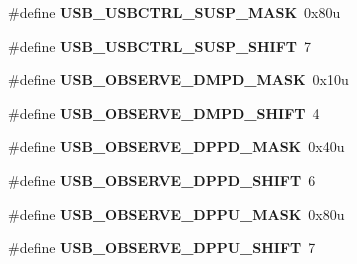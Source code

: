 \begin{DoxyCompactItemize}
\item 
\hypertarget{group___u_s_b___register___masks_gac65859ca12bfe997afc67545c8b1a052}{}\#define {\bfseries U\+S\+B\+\_\+\+U\+S\+B\+C\+T\+R\+L\+\_\+\+S\+U\+S\+P\+\_\+\+M\+A\+S\+K}~0x80u\label{group___u_s_b___register___masks_gac65859ca12bfe997afc67545c8b1a052}

\item 
\hypertarget{group___u_s_b___register___masks_ga44772d68648a57e6341ceec7fd5268f3}{}\#define {\bfseries U\+S\+B\+\_\+\+U\+S\+B\+C\+T\+R\+L\+\_\+\+S\+U\+S\+P\+\_\+\+S\+H\+I\+F\+T}~7\label{group___u_s_b___register___masks_ga44772d68648a57e6341ceec7fd5268f3}

\item 
\hypertarget{group___u_s_b___register___masks_ga796850497f75cc88772d3826d1196a43}{}\#define {\bfseries U\+S\+B\+\_\+\+O\+B\+S\+E\+R\+V\+E\+\_\+\+D\+M\+P\+D\+\_\+\+M\+A\+S\+K}~0x10u\label{group___u_s_b___register___masks_ga796850497f75cc88772d3826d1196a43}

\item 
\hypertarget{group___u_s_b___register___masks_ga044fcfc292ba6db33ec4e847a6510440}{}\#define {\bfseries U\+S\+B\+\_\+\+O\+B\+S\+E\+R\+V\+E\+\_\+\+D\+M\+P\+D\+\_\+\+S\+H\+I\+F\+T}~4\label{group___u_s_b___register___masks_ga044fcfc292ba6db33ec4e847a6510440}

\item 
\hypertarget{group___u_s_b___register___masks_ga8368ad607c0f5a0ab499734e26f36aad}{}\#define {\bfseries U\+S\+B\+\_\+\+O\+B\+S\+E\+R\+V\+E\+\_\+\+D\+P\+P\+D\+\_\+\+M\+A\+S\+K}~0x40u\label{group___u_s_b___register___masks_ga8368ad607c0f5a0ab499734e26f36aad}

\item 
\hypertarget{group___u_s_b___register___masks_gaba84f8caae5d942588bd678bbc2ad267}{}\#define {\bfseries U\+S\+B\+\_\+\+O\+B\+S\+E\+R\+V\+E\+\_\+\+D\+P\+P\+D\+\_\+\+S\+H\+I\+F\+T}~6\label{group___u_s_b___register___masks_gaba84f8caae5d942588bd678bbc2ad267}

\item 
\hypertarget{group___u_s_b___register___masks_ga04f8b1d77478cb027a79323cef482965}{}\#define {\bfseries U\+S\+B\+\_\+\+O\+B\+S\+E\+R\+V\+E\+\_\+\+D\+P\+P\+U\+\_\+\+M\+A\+S\+K}~0x80u\label{group___u_s_b___register___masks_ga04f8b1d77478cb027a79323cef482965}

\item 
\hypertarget{group___u_s_b___register___masks_ga08ff5b00473fda9eb458f3457490eb15}{}\#define {\bfseries U\+S\+B\+\_\+\+O\+B\+S\+E\+R\+V\+E\+\_\+\+D\+P\+P\+U\+\_\+\+S\+H\+I\+F\+T}~7\label{group___u_s_b___register___masks_ga08ff5b00473fda9eb458f3457490eb15}


\end{DoxyCompactItemize}
